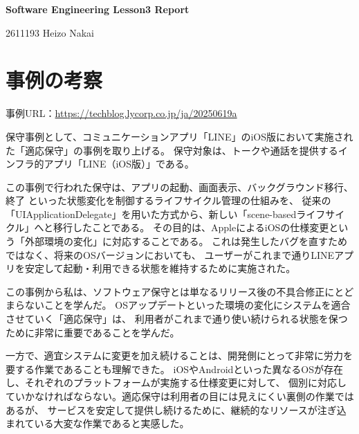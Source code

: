 \documentclass[uplatex,dvipdfmx,11pt,a4paper]{bxjsarticle}
\begin{document}
\begin{center}
{\LARGE \textbf{Software Engineering Lesson3 Report}}
\end{center}

\vspace{1em}

\begin{flushright}
2611193 Heizo Nakai
\end{flushright}

\section*{事例の考察}

\noindent 事例URL：\url{https://techblog.lycorp.co.jp/ja/20250619a}

\par\medskip
保守事例として、コミュニケーションアプリ「LINE」のiOS版において実施された「適応保守」の事例を取り上げる。
保守対象は、トークや通話を提供するインフラ的アプリ「LINE（iOS版）」である。

この事例で行われた保守は、アプリの起動、画面表示、バックグラウンド移行、終了
といった状態変化を制御するライフサイクル管理の仕組みを、
従来の「UIApplicationDelegate」を用いた方式から、新しい「scene-basedライフサイクル」へと移行したことである。
その目的は、AppleによるiOSの仕様変更という「外部環境の変化」に対応することである。
これは発生したバグを直すためではなく、将来のOSバージョンにおいても、
ユーザーがこれまで通りLINEアプリを安定して起動・利用できる状態を維持するために実施された。

この事例から私は、ソフトウェア保守とは単なるリリース後の不具合修正にとどまらないことを学んだ。
OSアップデートといった環境の変化にシステムを適合させていく「適応保守」は、
利用者がこれまで通り使い続けられる状態を保つために非常に重要であることを学んだ。

一方で、適宜システムに変更を加え続けることは、開発側にとって非常に労力を要する作業であることも理解できた。
iOSやAndroidといった異なるOSが存在し、それぞれのプラットフォームが実施する仕様変更に対して、
個別に対応していかなければならない。適応保守は利用者の目には見えにくい裏側の作業ではあるが、
サービスを安定して提供し続けるために、継続的なリソースが注ぎ込まれている大変な作業であると実感した。
\end{document}
